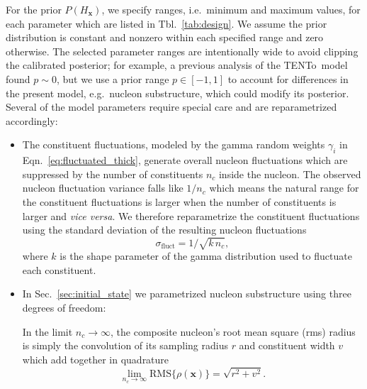 \documentclass[aps,prc,reprint,amsmath,nofootinbib]{revtex4-1}
\newcommand{\trento}{T\raisebox{-0.5ex}{R}ENTo}
\newcommand{\x}{\mathbf{x}}
\begin{document}
For the prior $P(H_\x)$, we specify ranges, i.e.\ minimum and maximum values, for each parameter which are listed in Tbl.~\ref{tab:design}.
We assume the prior distribution is constant and nonzero within each specified range and zero otherwise.
The selected parameter ranges are intentionally wide to avoid clipping the calibrated posterior; for example, a previous analysis of the \trento\ model \cite{Bernhard:2016tnd} found $p \sim 0$, but we use a prior range $p \in [-1, 1]$ to account for differences in the present model, e.g.\ nucleon substructure, which could modify its posterior.
Several of the model parameters require special care and are reparametrized accordingly:
\begin{itemize}[leftmargin=2\parindent]
  \item The constituent fluctuations, modeled by the gamma random weights $\gamma_i$ in Eqn.~\eqref{eq:fluctuated_thick}, generate overall nucleon fluctuations which are suppressed by the number of constituents $n_c$ inside the nucleon.
    The observed nucleon fluctuation variance falls like $1 / n_c$ which means the natural range for the constituent fluctuations is larger when the number of constituents is larger and \emph{vice versa}.
    We therefore reparametrize the constituent fluctuations using the standard deviation of the resulting nucleon fluctuations
    \begin{equation}
      \sigma_\mathrm{fluct} = 1 / \sqrt{k\, n_c},
    \end{equation}
    where $k$ is the shape parameter of the gamma distribution used to fluctuate each constituent.
  \item In Sec.~\ref{sec:initial_state} we parametrized nucleon substructure using three degrees of freedom:
    In the limit $n_c \to \infty$, the composite nucleon's root mean square (rms) radius is simply the convolution of its sampling radius $r$ and constituent width $v$ which add together in quadrature
  \begin{equation}
    \lim_{n_c \to\infty} \mathrm{RMS}\{\rho(\mathbf{x})\} = \sqrt{r^2 + v^2}.

\end{equation}
\end{itemize}
\end{document}
